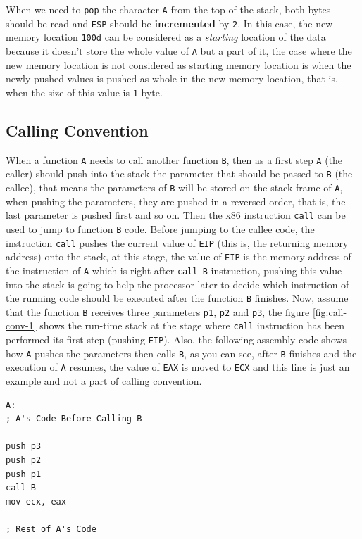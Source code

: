 When we need to \lstinline!pop! the character \lstinline!A! from the top
of the stack, both bytes should be read and \lstinline!ESP! should be
\textbf{incremented} by \lstinline!2!. In this case, the new memory
location \lstinline!100d! can be considered as a \emph{starting}
location of the data because it doesn't store the whole value of
\lstinline!A! but a part of it, the case where the new memory location
is not considered as starting memory location is when the newly pushed
values is pushed as whole in the new memory location, that is, when the
size of this value is \lstinline!1! byte.

\subsection{Calling Convention}\label{calling-convention}

When a function \lstinline!A! needs to call another function
\lstinline!B!, then as a first step \lstinline!A! (the caller) should
push into the stack the parameter that should be passed to \lstinline!B!
(the callee), that means the parameters of \lstinline!B! will be stored
on the stack frame of \lstinline!A!, when pushing the parameters, they
are pushed in a reversed order, that is, the last parameter is pushed
first and so on. Then the x86 instruction \lstinline!call! can be used
to jump to function \lstinline!B! code. Before jumping to the callee
code, the instruction \lstinline!call! pushes the current value of
\lstinline!EIP! (this is, the returning memory address) onto the stack,
at this stage, the value of \lstinline!EIP! is the memory address of the
instruction of \lstinline!A! which is right after \lstinline!call B!
instruction, pushing this value into the stack is going to help the
processor later to decide which instruction of the running code should
be executed after the function \lstinline!B! finishes. Now, assume that
the function \lstinline!B! receives three parameters \lstinline!p1!,
\lstinline!p2! and \lstinline!p3!, the figure \ref{fig:call-conv-1}
shows the run-time stack at the stage where \lstinline!call! instruction
has been performed its first step (pushing \lstinline!EIP!). Also, the
following assembly code shows how \lstinline!A! pushes the parameters
then calls \lstinline!B!, as you can see, after \lstinline!B! finishes
and the execution of \lstinline!A! resumes, the value of \lstinline!EAX!
is moved to \lstinline!ECX! and this line is just an example and not a
part of calling convention.

\begin{lstlisting}
A:
; A's Code Before Calling B

push p3
push p2
push p1
call B
mov ecx, eax

; Rest of A's Code
\end{lstlisting}

